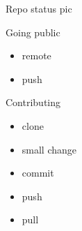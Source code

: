 \documentclass{beamer}
\begin{document}
\begin{frame}{Repo status}
pic
\end{frame}

\begin{frame}{Going public}
  \begin{itemize}
    \item remote
    \item push
  \end{itemize}
\end{frame}

\begin{frame}{Contributing}
  \begin{itemize}
    \item clone
    \item small change
    \item commit
    \item push
    \item pull
  \end{itemize}
\end{frame}
\end{document}
